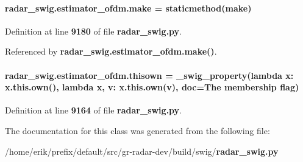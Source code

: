 \paragraph[{make}]{\setlength{\rightskip}{0pt plus 5cm}radar\+\_\+swig.\+estimator\+\_\+ofdm.\+make = staticmethod(make)\hspace{0.3cm}{\ttfamily [static]}}\label{classradar__swig_1_1estimator__ofdm_ad984a44ea1dd0ef9f2a7942b39012265}


Definition at line {\bf 9180} of file {\bf radar\+\_\+swig.\+py}.



Referenced by {\bf radar\+\_\+swig.\+estimator\+\_\+ofdm.\+make()}.

\paragraph[{thisown}]{\setlength{\rightskip}{0pt plus 5cm}radar\+\_\+swig.\+estimator\+\_\+ofdm.\+thisown = {\bf \+\_\+swig\+\_\+property}(lambda x\+: x.\+this.\+own(), lambda {\bf x}, v\+: x.\+this.\+own(v), doc=\textquotesingle{}The membership flag\textquotesingle{})\hspace{0.3cm}{\ttfamily [static]}}\label{classradar__swig_1_1estimator__ofdm_a90cb588c8a6b90c0134199c59d1ee887}


Definition at line {\bf 9164} of file {\bf radar\+\_\+swig.\+py}.



The documentation for this class was generated from the following file\+:\begin{DoxyCompactItemize}
\item 
/home/erik/prefix/default/src/gr-\/radar-\/dev/build/swig/{\bf radar\+\_\+swig.\+py}\end{DoxyCompactItemize}
